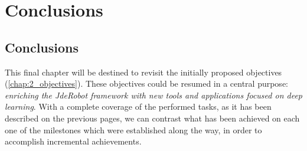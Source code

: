 \chapter{Conclusions}
\section{Conclusions}
	This final chapter will be destined to revisit the initially proposed objectives (\autoref{chap:2_objectives}). These objectives could be resumed in a central purpose: \emph{enriching the JdeRobot framework with new tools and applications focused on deep learning}. With a complete coverage of the performed tasks, as it has been described on the previous pages, we can contrast what has been achieved on each one of the milestones which were established along the way, in order to accomplish incremental achievements.\\
	

